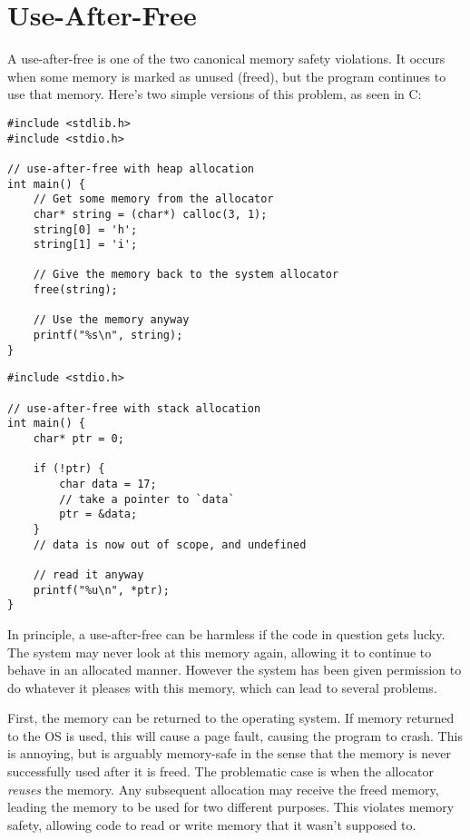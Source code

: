 \section{Use-After-Free}

A use-after-free is one of the two canonical memory safety violations. It
occurs when some memory is marked as unused (freed), but the program
continues to use that memory. Here's two simple versions of this problem, as
seen in C:

\begin{verbatim}
#include <stdlib.h>
#include <stdio.h>

// use-after-free with heap allocation
int main() {
    // Get some memory from the allocator
    char* string = (char*) calloc(3, 1);
    string[0] = 'h';
    string[1] = 'i';

    // Give the memory back to the system allocator
    free(string);

    // Use the memory anyway
    printf("%s\n", string);
}
\end{verbatim}

\begin{verbatim}
#include <stdio.h>

// use-after-free with stack allocation
int main() {
    char* ptr = 0;

    if (!ptr) {
        char data = 17;
        // take a pointer to `data`
        ptr = &data;
    }
    // data is now out of scope, and undefined

    // read it anyway
    printf("%u\n", *ptr);
}
\end{verbatim}

In principle, a use-after-free can be harmless if the code in question gets lucky.
The system may never look at this memory again, allowing it to continue to
behave in an allocated manner. However the system has been given permission
to do whatever it pleases with this memory, which can lead to several problems.

First, the memory can be returned to the operating system. If memory returned
to the OS is used, this will cause a page fault, causing the program to crash.
This is annoying, but is arguably memory-safe in the sense that the memory
is never successfully used after it is freed. The problematic case is when the
allocator \emph{reuses} the memory. Any subsequent allocation may receive the
freed memory, leading the memory to be used for two different purposes. This
violates memory safety, allowing code to read or write memory that it wasn't
supposed to.

